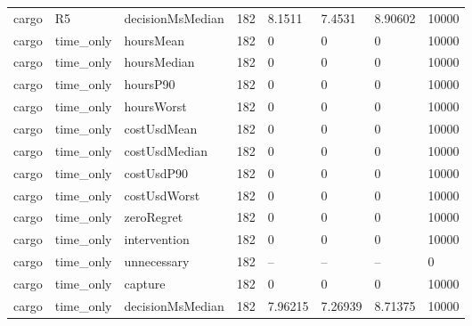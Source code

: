 \begin{tabular}{llllllll}
cargo & R5 & decisionMsMedian & 182 & 8.1511 & 7.4531 & 8.90602 & 10000 \\
cargo & time\_only & hoursMean & 182 & 0 & 0 & 0 & 10000 \\
cargo & time\_only & hoursMedian & 182 & 0 & 0 & 0 & 10000 \\
cargo & time\_only & hoursP90 & 182 & 0 & 0 & 0 & 10000 \\
cargo & time\_only & hoursWorst & 182 & 0 & 0 & 0 & 10000 \\
cargo & time\_only & costUsdMean & 182 & 0 & 0 & 0 & 10000 \\
cargo & time\_only & costUsdMedian & 182 & 0 & 0 & 0 & 10000 \\
cargo & time\_only & costUsdP90 & 182 & 0 & 0 & 0 & 10000 \\
cargo & time\_only & costUsdWorst & 182 & 0 & 0 & 0 & 10000 \\
cargo & time\_only & zeroRegret & 182 & 0 & 0 & 0 & 10000 \\
cargo & time\_only & intervention & 182 & 0 & 0 & 0 & 10000 \\
cargo & time\_only & unnecessary & 182 & -- & -- & -- & 0 \\
cargo & time\_only & capture & 182 & 0 & 0 & 0 & 10000 \\
cargo & time\_only & decisionMsMedian & 182 & 7.96215 & 7.26939 & 8.71375 & 10000 \\
\bottomrule
\end{tabular}

